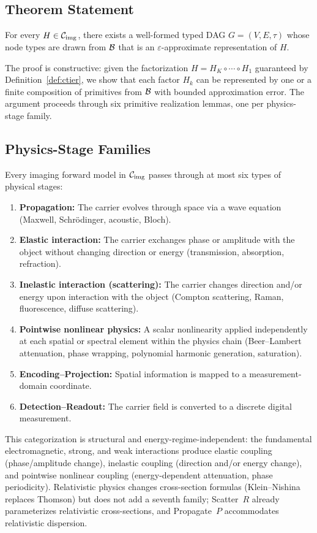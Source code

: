 \documentclass[11pt]{article}
\begin{document}
\subsection{Theorem Statement}

\begin{theorem}
\label{thm:fpb}
For every $H \in \mathcal{C}_{\mathrm{img}}$, there exists a well-formed typed DAG $G = (V, E, \tau)$ whose node types are drawn from $\mathcal{B}$ that is an $\varepsilon$-approximate representation of $H$.
\end{theorem}

The proof is constructive: given the factorization $H = H_K \circ \cdots \circ H_1$ guaranteed by Definition~\ref{def:ctier}, we show that each factor $H_k$ can be represented by one or a finite composition of primitives from $\mathcal{B}$ with bounded approximation error. The argument proceeds through six primitive realization lemmas, one per physics-stage family.

\subsection{Physics-Stage Families}

Every imaging forward model in $\mathcal{C}_{\mathrm{img}}$ passes through at most six types of physical stages:
\begin{enumerate}
  \item \textbf{Propagation:} The carrier evolves through space via a wave equation (Maxwell, Schr\"{o}dinger, acoustic, Bloch).
  \item \textbf{Elastic interaction:} The carrier exchanges phase or amplitude with the object without changing direction or energy (transmission, absorption, refraction).
  \item \textbf{Inelastic interaction (scattering):} The carrier changes direction and/or energy upon interaction with the object (Compton scattering, Raman, fluorescence, diffuse scattering).
  \item \textbf{Pointwise nonlinear physics:} A scalar nonlinearity applied independently at each spatial or spectral element within the physics chain (Beer--Lambert attenuation, phase wrapping, polynomial harmonic generation, saturation).
  \item \textbf{Encoding--Projection:} Spatial information is mapped to a measurement-domain coordinate.
  \item \textbf{Detection--Readout:} The carrier field is converted to a discrete digital measurement.
\end{enumerate}
This categorization is structural and energy-regime-independent: the fundamental electromagnetic, strong, and weak interactions produce elastic coupling (phase/amplitude change), inelastic coupling (direction and/or energy change), and pointwise nonlinear coupling (energy-dependent attenuation, phase periodicity). Relativistic physics changes cross-section formulas (Klein--Nishina replaces Thomson) but does not add a seventh family; Scatter~$R$ already parameterizes relativistic cross-sections, and Propagate~$P$ accommodates relativistic dispersion.
\end{document}
